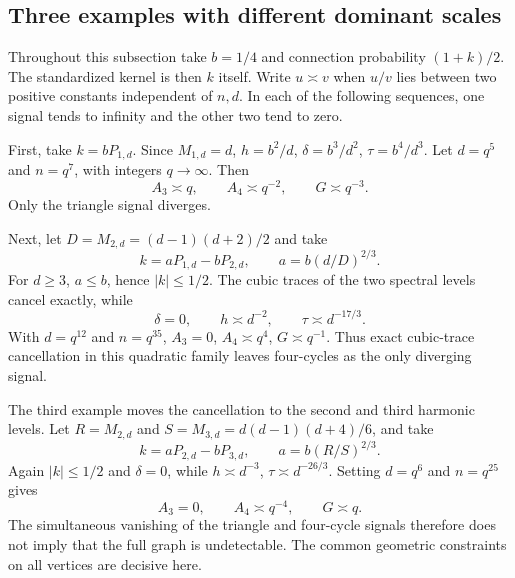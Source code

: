 \documentclass[11pt,reqno]{amsart}
\numberwithin{equation}{section}
\theoremstyle{definition}
\theoremstyle{remark}
\theoremstyle{definition}
\begin{document}
\subsection{Three examples with different dominant scales}
Throughout this subsection take $b=1/4$ and connection probability $(1+k)/2$.
The standardized kernel is then $k$ itself.
Write $u\asymp v$ when $u/v$ lies between two positive constants independent of $n,d$.
In each of the following sequences, one signal tends to infinity and the other two tend to zero.

First, take $k=bP_{1,d}$. Since $M_{1,d}=d$,
$h=b^2/d$, $\delta=b^3/d^2$, $\tau=b^4/d^3$.
Let $d=q^5$ and $n=q^7$, with integers $q\to\infty$. Then
\[
 A_3\asymp q,\qquad A_4\asymp q^{-2},\qquad G\asymp q^{-3}.
\]
Only the triangle signal diverges.

Next, let $D=M_{2,d}=(d-1)(d+2)/2$ and take
\[
 k=aP_{1,d}-bP_{2,d},\qquad a=b(d/D)^{2/3}.
\]
For $d\ge3$, $a\le b$, hence $|k|\le1/2$.
The cubic traces of the two spectral levels cancel exactly, while
\[
 \delta=0,\qquad h\asymp d^{-2},\qquad \tau\asymp d^{-17/3}.
\]
With $d=q^{12}$ and $n=q^{35}$,
$A_3=0$, $A_4\asymp q^4$, $G\asymp q^{-1}$.
Thus exact cubic-trace cancellation in this quadratic family leaves four-cycles as the only diverging signal.

The third example moves the cancellation to the second and third harmonic levels.
Let $R=M_{2,d}$ and $S=M_{3,d}=d(d-1)(d+4)/6$, and take
\[
 k=aP_{2,d}-bP_{3,d},\qquad a=b(R/S)^{2/3}.
\]
Again $|k|\le1/2$ and $\delta=0$, while
$h\asymp d^{-3}$, $\tau\asymp d^{-26/3}$.
Setting $d=q^6$ and $n=q^{25}$ gives
\[
 A_3=0,\qquad A_4\asymp q^{-4},\qquad G\asymp q.
\]
The simultaneous vanishing of the triangle and four-cycle signals therefore does not imply that the full graph is undetectable.
The common geometric constraints on all vertices are decisive here.
\end{document}
